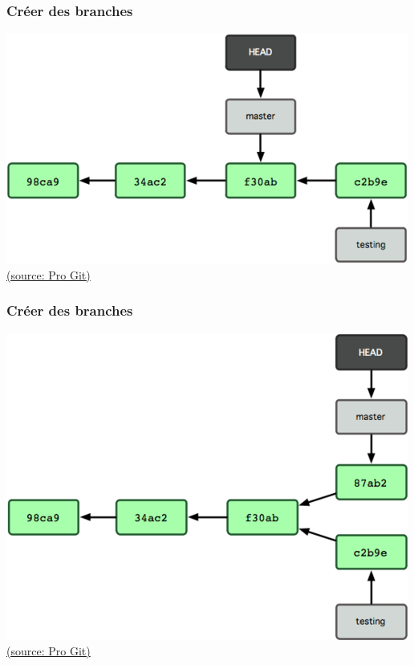 \documentclass[t,11pt]{beamer}
\begin{document}
\begin{frame}
        \frametitle{Cr\'eer des branches}
        \centering
        \includegraphics[width=\linewidth,height=0.8\textheight,keepaspectratio]{./img/branching_5}
        \newline
        \href{https://git-scm.com/book/fr/v1/Les-branches-avec-Git-Ce-qu-est-une-branche}{{\tiny (source: Pro Git)}}
\end{frame}

\begin{frame}
        \frametitle{Cr\'eer des branches}
        \centering
        \includegraphics[width=\linewidth,height=0.8\textheight,keepaspectratio]{./img/branching_6}
        \newline
        \href{https://git-scm.com/book/fr/v1/Les-branches-avec-Git-Ce-qu-est-une-branche}{{\tiny (source: Pro Git)}}
\end{frame}
\end{document}
